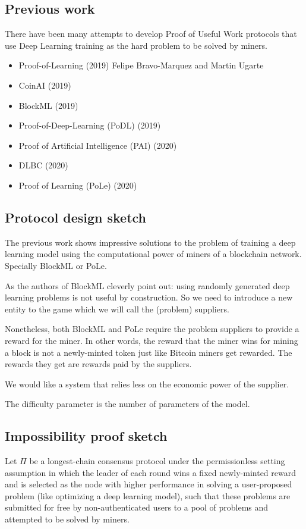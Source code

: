 \documentclass[conference]{IEEEtran}
\begin{document}
\subsection{Previous work}
There have been many attempts to develop Proof of Useful Work protocols that use Deep Learning training as the hard problem to be solved by miners.

\begin{itemize}
\item Proof-of-Learning (2019) Felipe Bravo-Marquez and Martin Ugarte
\item CoinAI (2019) 
\item BlockML (2019)
\item Proof-of-Deep-Learning (PoDL) (2019)
\item Proof of Artificial Intelligence (PAI) (2020)
\item DLBC (2020)
\item Proof of Learning (PoLe) (2020)
\end{itemize}


\subsection{Protocol design sketch}
The previous work shows impressive solutions to the problem of training a deep learning model using the computational power of miners of a blockchain network. Specially BlockML or PoLe.

As the authors of BlockML cleverly point out: using randomly generated deep learning problems is not useful by construction. So we need to introduce a new entity to the game which we will call the (problem) suppliers.

Nonetheless, both BlockML and PoLe require the problem suppliers to provide a reward for the miner. In other words, the reward that the miner wins for mining a block is not a newly-minted token just like Bitcoin miners get rewarded. The rewards they get are rewards paid by the suppliers.

We would like a system that relies less on the economic power of the supplier.

The difficulty parameter is the number of parameters of the model.

\subsection{Impossibility proof sketch}

Let $\Pi$ be a longest-chain consensus protocol under the permissionless setting assumption in which the leader of each round wins a fixed newly-minted reward and is selected as the node with higher performance in solving a user-proposed problem (like optimizing a deep learning model), such that these problems are submitted for free by non-authenticated users to a pool of problems and attempted to be solved by miners.
\end{document}
